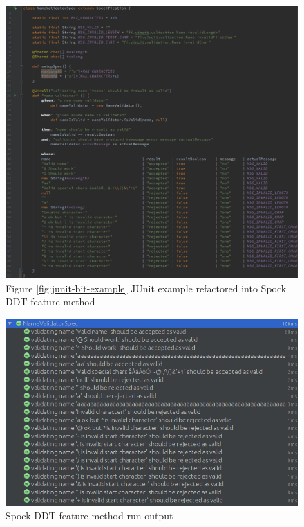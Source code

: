     \begin{figure}[H]
      \begin{center}
        \centerline{\includegraphics[width=15.7cm]{images/spock-validator-example.png}}
        \caption{Figure \ref{fig:junit-bit-example} JUnit example refactored into Spock DDT feature method}
        \label{fig:spock-bit-example}
      \end{center}
    \end{figure}

    \vspace{-38px}

    \begin{figure}[H]
      \begin{center}
        \includegraphics[width=12.7cm]{images/spock-validator-results.png}
        \caption{Spock DDT feature method run output}
        \label{fig:junit-bit-results}
      \end{center}
    \end{figure}
\restoregeometry
